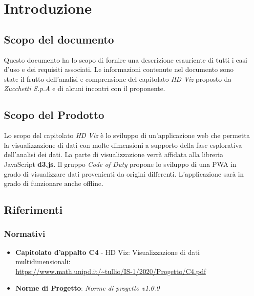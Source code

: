 \section{Introduzione}
    \subsection{Scopo del documento}
    Questo documento ha lo scopo di fornire una descrizione esauriente di tutti i casi d'uso e dei requisiti associati. Le informazioni contenute nel documento sono state il frutto dell'analisi e comprensione del capitolato \emph{HD Viz} proposto da \emph{Zucchetti S.p.A} e di alcuni incontri con il proponente.
    \subsection{Scopo del Prodotto}
    Lo scopo del capitolato \emph{HD Viz} è lo sviluppo di un'applicazione web che permetta la visualizzazione di dati con molte dimensioni a supporto della fase esplorativa dell'analisi dei dati. La parte di visualizzazione verrà affidata alla libreria JavaScript \textbf{d3.js}. Il gruppo \emph{Code of Duty} propone lo sviluppo di una PWA in grado di visualizzare dati provenienti da origini differenti. L'applicazione sarà in grado di funzionare anche offline.
    \subsection{Riferimenti}
    \subsubsection{Normativi}
    \begin{itemize}
        \item \textbf{Capitolato d'appalto C4} - HD Viz: Visualizzazione di dati multidimensionali:\\\url{https://www.math.unipd.it/~tullio/IS-1/2020/Progetto/C4.pdf}
        \item \textbf{Norme di Progetto}: \emph{Norme di progetto v1.0.0}
    \end{itemize}
